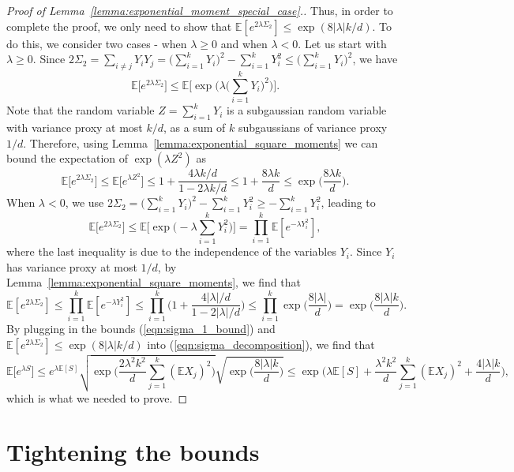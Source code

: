 \documentclass[11pt]{amsart}
\theoremstyle{definition}
\def\bE{\mathbb{E}}
\begin{document}
\begin{proof}[Proof of Lemma~\ref{lemma:exponential_moment_special_case}.]
Thus, in order to complete the proof, we only need to show that $\bE[e^{2\lambda \Sigma_2}]\leq \exp(8|\lambda| k/d)$. To do this, we consider two cases - when $\lambda\geq 0$ and when $\lambda<0$. Let us start with $\lambda\geq 0$. Since $2\Sigma_2=\sum_{i\neq j}Y_iY_j=\Big(\sum_{i=1}^k Y_i\Big)^2-\sum_{i=1}^k Y_i^2\leq \Big(\sum_{i=1}^k Y_i\Big)^2$, we have
{\smaller[0.3]
\[\bE\big[e^{2\lambda\Sigma_2}\big]\leq \bE\bigg[\exp\bigg(\lambda\bigg(\sum_{i=1}^k Y_i\bigg)^2\bigg)\bigg].\]
}
Note that the random variable $Z=\sum_{i=1}^k Y_i$ is a subgaussian random variable with variance proxy at most $k/d$, as a sum of $k$ subgaussians of variance proxy $1/d$. Therefore, using Lemma~\ref{lemma:exponential_square_moments} we can bound the expectation of $\exp(\lambda Z^2)$ as
{\smaller[0.3]
\begin{equation*}
    \bE\big[e^{2\lambda\Sigma_2}\big]\leq \bE\big[e^{\lambda Z^2}\big]\leq 1+\frac{4\lambda k/d}{1-2\lambda k/d}\leq 1+\frac{8\lambda k}{d}\leq \exp\bigg(\frac{8\lambda k}{d}\bigg).
\end{equation*}
}
When $\lambda<0$, we use $2\Sigma_2=\Big(\sum_{i=1}^k Y_i\Big)^2-\sum_{i=1}^k Y_i^2\geq -\sum_{i=1}^k Y_i^2$, leading to
{\smaller[0.3]
\[\bE\big[e^{2\lambda\Sigma_2}\big]\leq \bE\bigg[\exp\bigg(-\lambda\sum_{i=1}^k Y_i^2\bigg)\bigg]=\prod_{i=1}^k \bE[e^{-\lambda Y_i^2}],\]
}
where the last inequality is due to the independence of the variables $Y_i$. Since $Y_i$ has variance proxy at most $1/d$, by Lemma~\ref{lemma:exponential_square_moments}, we find that
{\smaller[0.3]
\[\bE[e^{2\lambda\Sigma_2}]\leq \prod_{i=1}^k \bE[e^{-\lambda Y_i^2}]\leq \prod_{i=1}^k \bigg(1+\frac{4|\lambda|/d}{1-2|\lambda|/d}\bigg)\leq \prod_{i=1}^k \exp\bigg(\frac{8|\lambda|}{d}\bigg)=\exp\bigg(\frac{8|\lambda| k}{d}\bigg).\]
}
By plugging in the bounds (\ref{eqn:sigma_1_bound}) and $\bE[e^{2\lambda \Sigma_2}]\leq \exp(8|\lambda| k/d)$ into (\ref{eqn:sigma_decomposition}), we find that
{\smaller[0.3]
\[\bE\big[e^{\lambda S}\big]\leq e^{\lambda \bE[S]}\sqrt{\exp\bigg(\frac{2\lambda^2k^2}{d}\sum_{j=1}^k (\bE X_j)^2\bigg)}\sqrt{\exp\bigg(\frac{8|\lambda| k}{d}\bigg)}\leq \exp\bigg( \lambda \bE[S] + \frac{\lambda^2k^2}{d}\sum_{j=1}^k (\bE X_j)^2 +\frac{4|\lambda| k}{d}\bigg),\]
}
which is what we needed to prove.
\end{proof}

\section{Tightening the bounds}\label{sec:appendix_2}
\end{document}
